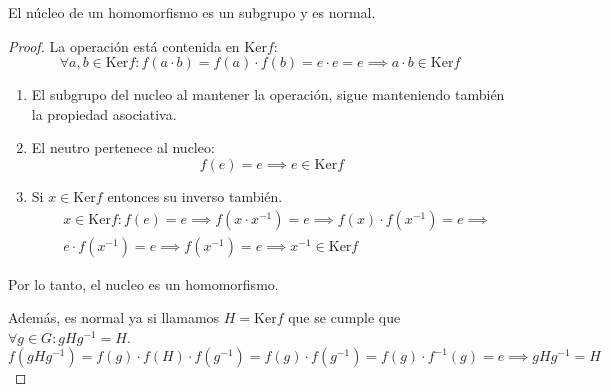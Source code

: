 \begin{thm}
    El núcleo de un homomorfismo es un subgrupo y es normal.
\end{thm}

\begin{proof}
    La operación está contenida en $\text{Ker}f$:
    \begin{equation}
        \forall a,b \in \text{Ker} f: f(a\cdot b) = f(a) \cdot f(b) = e \cdot e = e \implies a\cdot b \in \text{Ker} f
    \end{equation}

    \begin{enumerate}
        \item El subgrupo del nucleo al mantener la operación, sigue manteniendo también la propiedad asociativa.
        \item El neutro pertenece al nucleo:
        \begin{equation}
            f(e) = e \implies e \in \text{Ker} f
        \end{equation}
        \item Si $x \in \text{Ker} f$ entonces su inverso también.
        \begin{equation}
            \begin{split}
                & x \in \text{Ker} f : f(e) = e \implies f(x \cdot x^{-1}) = e \implies f(x) \cdot f(x^{-1}) = e \implies\\
                & e \cdot f(x^{-1}) = e \implies f(x^{-1}) = e \implies x^{-1} \in \text{Ker} f 
            \end{split}
        \end{equation}
    \end{enumerate}

    Por lo tanto, el nucleo es un homomorfismo.

    Además, es normal ya si llamamos $H = \text{Ker} f$ que se cumple que $\forall g \in G: g H g^{-1} = H$.
    \begin{equation}
        f(gHg^{-1}) = f(g) \cdot f(H) \cdot f(g^{-1}) = f(g) \cdot f(g^{-1}) = f(g) \cdot f^{-1}(g) = e \implies g H g^{-1} = H  
    \end{equation}
\end{proof}
